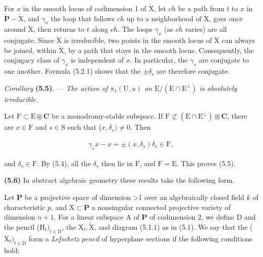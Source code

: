 \documentclass[10pt,leqno]{article}
\begin{document}
\noindent For \(x\) in the smooth locus of codimension 1 of \(\check{\mathrm{X}}\), let \(ch\) be a path from \(t\) to \(x\) in \(\check{\mathbf{P}}- \check{\mathrm{X}}\), and \(\gamma _{x}\) the loop that follows \(ch\) up to a neighborhood of \(\check{\mathrm{X}}\), goes once around \(\check{\mathrm{X}}\), then returns to \(t\) along \(ch\). The loops \(\gamma _{x}\) (as \(ch\) varies) are all conjugate. Since \(\check{\mathrm{X}}\) is irreducible, two points in the smooth locus of \(\check{\mathrm{X}}\) can always be joined, within \(\check{\mathrm{X}}\), by a path that stays in the smooth locus. Consequently, the conjugacy class of \(\gamma _{x}\) is independent of \(x\). In particular, the \(\gamma _{s}\) are conjugate to one another. Formula (5.2.1) shows that the \(\pm \delta _{s}\) are therefore conjugate.\par

\noindent \emph{Corollary} \textbf{(5.5)}. — {\itshape The action of \(\pi _{1}(\mathrm{U},u)\) on \(\mathrm{E}/(\mathrm{E}\cap \mathrm{E}^{\perp })\) is absolutely irreducible.}\par

\noindent Let \(\mathrm{F}\subset \mathrm{E}\otimes \mathbf{C}\) be a monodromy-stable subspace. If \(\mathrm{F}\not\subset (\mathrm{E}\cap \mathrm{E}^{\perp })\otimes \mathbf{C}\), there are \(x\in \mathrm{F}\) and \(s\in \mathrm{S}\) such that (\(x,\delta _{s})\ne 0\). Then\par

\begin{equation*}\begin{gathered}\gamma _{s} x- x = \pm (x,\delta _{s})\delta _{s} \in  \mathrm{F},\end{gathered}\end{equation*}

\noindent and \(\delta _{s}\in \mathrm{F}\). By (5.4), all the \(\delta _{s}\) then lie in \(\mathrm{F}\), and \(\mathrm{F}=\mathrm{E}\). This proves (5.5).\par

\noindent \textbf{(5.6)} In abstract algebraic geometry these results take the following form.\par

\noindent Let \(\mathbf{P}\) be a projective space of dimension >1 over an algebraically closed field \(k\) of characteristic \(p\), and \(\mathrm{X}\subset \mathbf{P}\) a nonsingular connected projective variety of dimension \(n+1\). For a linear subspace \(\mathrm{A}\) of \(\mathbf{P}\) of codimension 2, we define D and the pencil (\(\mathrm{H}_{t})_{t\in \mathrm{D}}\), the \(\mathrm{X}_{t}, \widetilde{\mathrm{X}}\), and diagram (5.1.1) as in (5.1). We say that the (\(\mathrm{X}_{t})_{t\in \mathrm{D}}\) form a \emph{Lefschetz pencil} of hyperplane sections if the following conditions hold:\par
\end{document}
